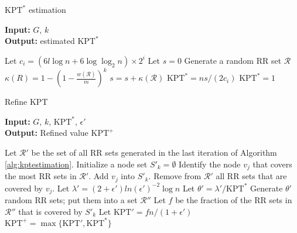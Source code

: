 \documentclass[a4paper,10pt]{article}
\begin{document}
\begin{algorithm}
\caption{$\text{KPT}^*$ estimation}\label{alg:kptestimation}
\hspace*{\algorithmicindent} \textbf{Input: } $G$, $k$\\
\hspace*{\algorithmicindent} \textbf{Output: } estimated $\text{KPT}^*$
\begin{algorithmic}[1]
\State Let $c_i = (6l\log n + 6\log\log_2 n)\times 2^i$
\State Let $s = 0$
\State Generate a random RR set $\mathcal{R}$
\State $\kappa(R) = 1 - \left(1-\frac{w(\mathcal{R})}{m}\right)^k$
\State $s = s + \kappa(\mathcal{R})$
\EndFor
{}
\State\Return $\text{KPT}^* = ns/(2c_i)$
\EndIf
\State\Return $\text{KPT}^* = 1$
\EndFor
\end{algorithmic}
\end{algorithm}

\begin{algorithm}
\caption{Refine KPT}\label{alg:kptrefinement}
\hspace*{\algorithmicindent} \textbf{Input: } $G$, $k$, $\text{KPT}^*$, $\epsilon'$\\
\hspace*{\algorithmicindent} \textbf{Output: } Refined value $\text{KPT}^+$
\begin{algorithmic}[1]
\State Let $\mathcal{R}'$ be the set of all RR sets generated in the last iteration of Algorithm \ref{alg:kptestimation}.
\State Initialize a node set $S'_k = \emptyset$
\State Identify the node $v_j$ that covers the most RR sets in $\mathcal{R}'$.
\State Add $v_j$ into $S'_k$.
\State Remove from $\mathcal{R}'$ all RR sets that are covered by $v_j$.
\EndFor
\State Let $\lambda' = (2+\epsilon')ln (\epsilon')^{-2} \log n$
\State Let $\theta' = \lambda' / \text{KPT}^*$
\State Generate $\theta'$ random RR sets; put them into a set $\mathcal{R}''$
\State Let $f$ be the fraction of the RR sets in $\mathcal{R}''$ that is covered by $S'_k$
\State Let $\text{KPT}' = fn/(1+\epsilon')$
\State\Return $\text{KPT}^+ = \max\{\text{KPT}', \text{KPT}^*\}$
\end{algorithmic}
\end{algorithm}
\end{document}
